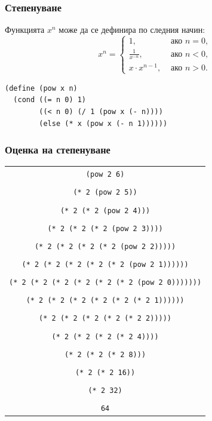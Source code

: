 \documentclass{beamer}
\begin{document}
\begin{frame}[fragile]
  \frametitle{Степенуване}

  Функцията $x^n$ може да се дефинира по следния начин:
  \begin{equation*}
    x^n = \begin{cases}
      1,&\text{ ако }n = 0,\\
      \frac 1 {x^{-n}},&\text{ ако }n < 0,\\
      x\cdot x^{n-1},&\text{ ако }n > 0.
    \end{cases}
  \end{equation*}

  \pause

\begin{verbatim}
(define (pow x n)
  (cond ((= n 0) 1)
        ((< n 0) (/ 1 (pow x (- n))))
        (else (* x (pow x (- n 1))))))
\end{verbatim}
\end{frame}

\begin{frame}
  \frametitle{Оценка на степенуване}

  \begin{center}
    \tiny
    \begin{tabular}{c}
      \tt{(pow 2 6)}\\
      \nxt{\bda\\
      \tt{(* 2 (pow 2 5))}\\
      \nxt{\bda\\
      \tt{(* 2 (* 2 (pow 2 4)))}\\
      \nxt{\bda\\
      \tt{(* 2 (* 2 (* 2 (pow 2 3))))}\\
      \nxt{\bda\\
      \tt{(* 2 (* 2 (* 2 (* 2 (pow 2 2)))))}\\
      \nxt{\bda\\
      \tt{(* 2 (* 2 (* 2 (* 2 (* 2 (pow 2 1))))))}\\
      \nxt{\bda\\
      \tt{(* 2 (* 2 (* 2 (* 2 (* 2 (* 2 (pow 2 0)))))))}\\
      \nxt{\bda\\
      \tt{(* 2 (* 2 (* 2 (* 2 (* 2 (* 2 1))))))}\\
      \nxt{\bda\\
      \tt{(* 2 (* 2 (* 2 (* 2 (* 2 2)))))}\\
      \nxt{\bda\\
      \tt{(* 2 (* 2 (* 2 (* 2 4))))}\\
      \nxt{\bda\\
      \tt{(* 2 (* 2 (* 2 8)))}\\
      \nxt{\bda\\
      \tt{(* 2 (* 2 16))}\\
      \nxt{\bda\\
      \tt{(* 2 32)}\\
      \nxt{\bda\\
      \tt{64}}}}}}}}}}}}}}
    \end{tabular}
  \end{center}

\end{frame}
\end{document}
